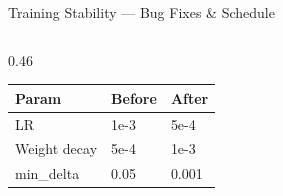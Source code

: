 \documentclass[aspectratio=169, 10pt]{beamer}
\begin{document}
\begin{frame}{Training Stability — Bug Fixes \& Schedule}
\begin{columns}[T]
\begin{column}{0.46\textwidth}
      \begin{center}
      {\small
      \begin{tabular}{lll}
        \toprule
        Param & Before & After \\
        \midrule
        LR & 1e-3 & 5e-4 \\
        Weight decay & 5e-4 & 1e-3 \\
        min\_delta & 0.05 & 0.001 \\
        \bottomrule
      \end{tabular}
      }
      \end{center}
    \end{column}
  \end{columns}
\end{frame}

\end{document}

